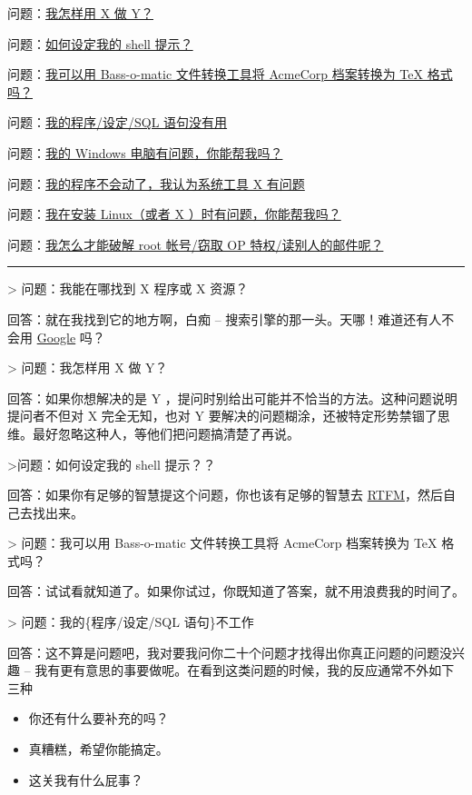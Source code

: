 \documentclass[titlepage]{article}
\begin{document}
问题：\protect\hyperlink{q2}{我怎样用 X 做 Y？}

问题：\protect\hyperlink{q3}{如何设定我的 shell 提示？}

问题：\protect\hyperlink{q4}{我可以用 Bass-o-matic 文件转换工具将
AcmeCorp 档案转换为 TeX 格式吗？}

问题：\protect\hyperlink{q5}{我的程序/设定/SQL 语句没有用}

问题：\protect\hyperlink{q6}{我的 Windows 电脑有问题，你能帮我吗？}

问题：\protect\hyperlink{q7}{我的程序不会动了，我认为系统工具 X 有问题}

问题：\protect\hyperlink{q8}{我在安装 Linux（或者 X
）时有问题，你能帮我吗？}

问题：\protect\hyperlink{q9}{我怎么才能破解 root 帐号/窃取 OP
特权/读别人的邮件呢？}

\begin{center}\rule{0.5\linewidth}{\linethickness}\end{center}

 \textgreater{} 问题：我能在哪找到 X 程序或 X 资源？

回答：就在我找到它的地方啊，白痴 --
搜索引擎的那一头。天哪！难道还有人不会用
\href{http://www.google.com}{Google} 吗？

 \textgreater{} 问题：我怎样用 X 做 Y？

回答：如果你想解决的是 Y
，提问时别给出可能并不恰当的方法。这种问题说明提问者不但对 X
完全无知，也对 Y
要解决的问题糊涂，还被特定形势禁锢了思维。最好忽略这种人，等他们把问题搞清楚了再说。

 \textgreater{}问题：如何设定我的 shell 提示？？

回答：如果你有足够的智慧提这个问题，你也该有足够的智慧去
\protect\hyperlink{RTFM}{RTFM}，然后自己去找出来。

 \textgreater{} 问题：我可以用 Bass-o-matic 文件转换工具将 AcmeCorp
档案转换为 TeX 格式吗？

回答：试试看就知道了。如果你试过，你既知道了答案，就不用浪费我的时间了。

 \textgreater{} 问题：我的\{程序/设定/SQL 语句\}不工作

回答：这不算是问题吧，我对要我问你二十个问题才找得出你真正问题的问题没兴趣
--
我有更有意思的事要做呢。在看到这类问题的时候，我的反应通常不外如下三种

\begin{itemize}

\item
  你还有什么要补充的吗？
\item
  真糟糕，希望你能搞定。
\item
  这关我有什么屁事？
\end{itemize}
\end{document}
